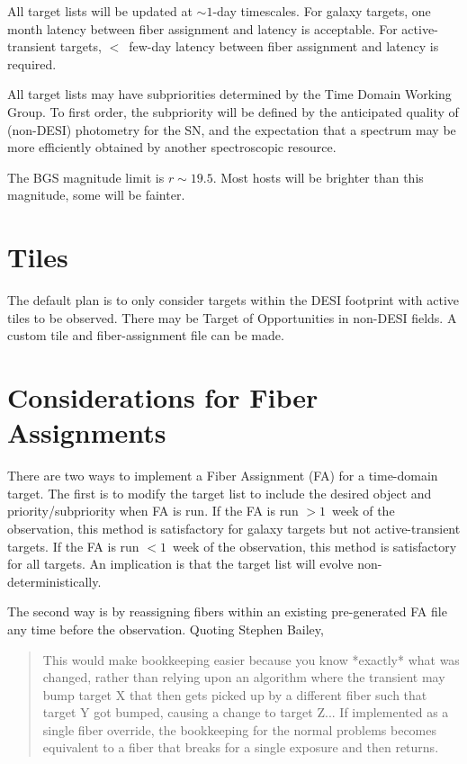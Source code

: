 \documentclass[11pt]{article}   	%
\begin{document}
All target lists will be updated at $\sim 1$-day timescales.  For galaxy targets, one month latency between fiber assignment and latency is acceptable.
 For active-transient targets, $<$~few-day latency between fiber assignment and latency is required.

All target lists may have subpriorities determined by the Time Domain Working Group.  To first order, the subpriority will be defined by the
anticipated quality of (non-DESI)  photometry for the SN, and the expectation that a spectrum may be more efficiently obtained by another
spectroscopic resource.

The BGS magnitude limit is $r \sim 19.5$.  Most hosts will be brighter than this magnitude, some will be fainter.

\section{Tiles}
The default plan is to only consider targets within the DESI footprint with active tiles to be observed.  There may be Target
of Opportunities in non-DESI fields.  A custom tile and fiber-assignment file can be made.

\section{Considerations for Fiber Assignments}

There are two ways to implement a Fiber Assignment (FA) for a time-domain target.  The first is to modify the target list to include 
the desired object and priority/subpriority when FA is run.   If the FA is run $> 1$~week of the observation, this method
is satisfactory for galaxy targets but not active-transient targets.  If the FA is run $<1$~week of the observation, this method is 
satisfactory for all targets.  An implication is that the target list will evolve non-deterministically.

The second way is by reassigning fibers within an existing pre-generated FA file any time before the observation.
Quoting Stephen Bailey,
\begin{quote}
This would make bookkeeping easier because you know *exactly* what was changed, rather than relying upon an algorithm where the transient may bump target X that then gets picked up by a different fiber such that target Y got bumped, causing a change to target Z...  If implemented as a single fiber override, the bookkeeping for the normal problems becomes equivalent to a fiber that breaks for a single exposure and then returns.
\end{quote}
\end{document}
